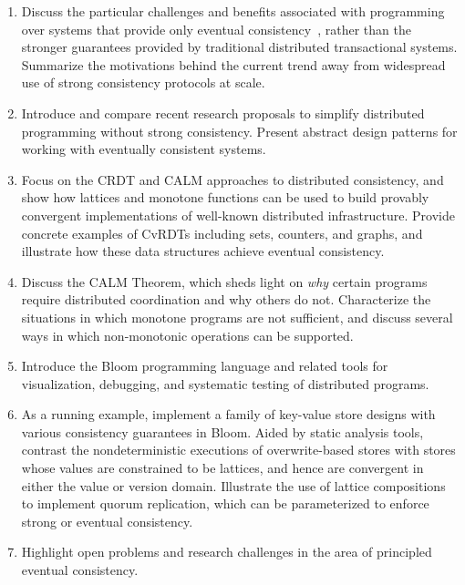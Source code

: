 \begin{enumerate}
\item
  Discuss the particular challenges and benefits associated with programming
  over systems that provide only eventual
  consistency~\cite{DeCandia2007,Terry1995,vogels}, rather than the stronger
  guarantees provided by traditional distributed transactional systems.
  Summarize the motivations behind the current trend away from widespread use of
  strong consistency protocols at scale.
\item
  Introduce and compare recent research proposals to simplify distributed
  programming without strong consistency.  Present abstract design patterns
  for working with eventually consistent systems.
\item
  Focus on the CRDT and CALM approaches to distributed consistency, and show how
  lattices and monotone functions can be used to build provably convergent
  implementations of well-known distributed infrastructure.  Provide concrete
  examples of CvRDTs including sets, counters, and graphs, and illustrate how
  these data structures achieve eventual consistency.
\item
  Discuss the CALM Theorem, which sheds light on \emph{why} certain programs
  require distributed coordination and why others do not.  Characterize the
  situations in which monotone programs are not sufficient, and discuss several
  ways in which non-monotonic operations can be supported.
\item
  Introduce the Bloom programming language and related tools for visualization,
  debugging, and systematic testing of distributed programs.
\item
  As a running example, implement a family of key-value store designs with
  various consistency guarantees in Bloom.  Aided by static analysis tools,
  contrast the nondeterministic executions of overwrite-based stores with stores
  whose values are constrained to be lattices, and hence are convergent in
  either the value or version domain.  Illustrate the use of lattice
  compositions to implement quorum replication, which can be parameterized to
  enforce strong or eventual consistency.
\item
  Highlight open problems and research challenges in the area of principled
  eventual consistency.
\end{enumerate}

